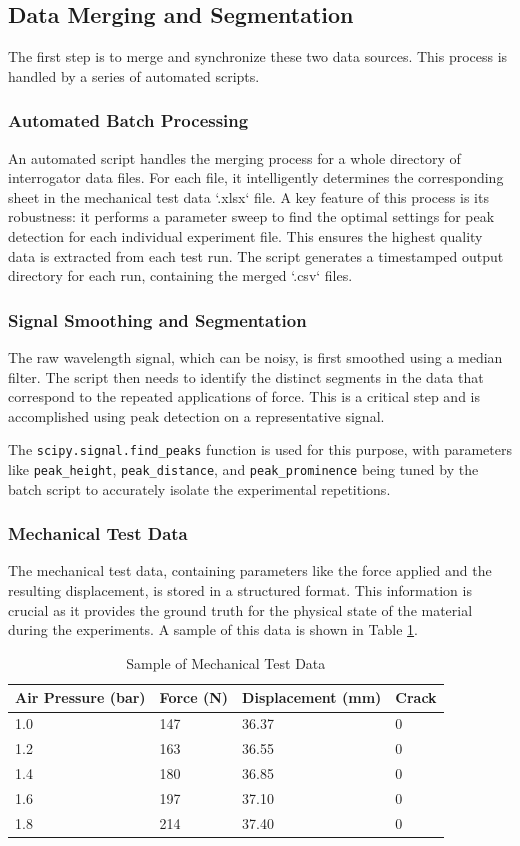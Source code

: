 \documentclass{article}
\begin{document}
\subsection{Data Merging and Segmentation}
The first step is to merge and synchronize these two data sources. This process is handled by a series of automated scripts.

\subsubsection{Automated Batch Processing}
An automated script handles the merging process for a whole directory of interrogator data files. For each file, it intelligently determines the corresponding sheet in the mechanical test data `.xlsx` file. A key feature of this process is its robustness: it performs a parameter sweep to find the optimal settings for peak detection for each individual experiment file. This ensures the highest quality data is extracted from each test run. The script generates a timestamped output directory for each run, containing the merged `.csv` files.

\subsubsection{Signal Smoothing and Segmentation}
The raw wavelength signal, which can be noisy, is first smoothed using a median filter. The script then needs to identify the distinct segments in the data that correspond to the repeated applications of force. This is a critical step and is accomplished using peak detection on a representative signal.

The \texttt{scipy.signal.find\_peaks} function is used for this purpose, with parameters like \texttt{peak\_height}, \texttt{peak\_distance}, and \texttt{peak\_prominence} being tuned by the batch script to accurately isolate the experimental repetitions.

\subsubsection{Mechanical Test Data}
The mechanical test data, containing parameters like the force applied and the resulting displacement, is stored in a structured format. This information is crucial as it provides the ground truth for the physical state of the material during the experiments. A sample of this data is shown in Table \ref{tab:metadata_sample}.

\begin{table}[h!]
\centering
\begin{tabular}{@{}llll@{}}
\toprule
Air Pressure (bar) & Force (N) & Displacement (mm) & Crack \\ \midrule
1.0 & 147 & 36.37 & 0 \\
1.2 & 163 & 36.55 & 0 \\
1.4 & 180 & 36.85 & 0 \\
1.6 & 197 & 37.10 & 0 \\
1.8 & 214 & 37.40 & 0 \\ \bottomrule
\end{tabular}
\caption{Sample of Mechanical Test Data}
\label{tab:metadata_sample}
\end{table}
\end{document}

